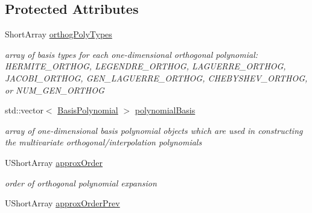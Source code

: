 \subsection*{Protected Attributes}
\begin{DoxyCompactItemize}
\item 
Short\+Array \hyperlink{classPecos_1_1SharedOrthogPolyApproxData_aa9641c919d4da3793dbdbbc4480564a0}{orthog\+Poly\+Types}\label{classPecos_1_1SharedOrthogPolyApproxData_aa9641c919d4da3793dbdbbc4480564a0}

\begin{DoxyCompactList}\small\item\em array of basis types for each one-\/dimensional orthogonal polynomial\+: H\+E\+R\+M\+I\+T\+E\+\_\+\+O\+R\+T\+H\+OG, L\+E\+G\+E\+N\+D\+R\+E\+\_\+\+O\+R\+T\+H\+OG, L\+A\+G\+U\+E\+R\+R\+E\+\_\+\+O\+R\+T\+H\+OG, J\+A\+C\+O\+B\+I\+\_\+\+O\+R\+T\+H\+OG, G\+E\+N\+\_\+\+L\+A\+G\+U\+E\+R\+R\+E\+\_\+\+O\+R\+T\+H\+OG, C\+H\+E\+B\+Y\+S\+H\+E\+V\+\_\+\+O\+R\+T\+H\+OG, or N\+U\+M\+\_\+\+G\+E\+N\+\_\+\+O\+R\+T\+H\+OG \end{DoxyCompactList}\item 
std\+::vector$<$ \hyperlink{classPecos_1_1BasisPolynomial}{Basis\+Polynomial} $>$ \hyperlink{classPecos_1_1SharedOrthogPolyApproxData_a9b1c6d91c0a7c0dcf1c392e5f2481eec}{polynomial\+Basis}\label{classPecos_1_1SharedOrthogPolyApproxData_a9b1c6d91c0a7c0dcf1c392e5f2481eec}

\begin{DoxyCompactList}\small\item\em array of one-\/dimensional basis polynomial objects which are used in constructing the multivariate orthogonal/interpolation polynomials \end{DoxyCompactList}\item 
U\+Short\+Array \hyperlink{classPecos_1_1SharedOrthogPolyApproxData_a73cfe58f0e35ea62e369fc419d48e670}{approx\+Order}\label{classPecos_1_1SharedOrthogPolyApproxData_a73cfe58f0e35ea62e369fc419d48e670}

\begin{DoxyCompactList}\small\item\em order of orthogonal polynomial expansion \end{DoxyCompactList}\item 
U\+Short\+Array \hyperlink{classPecos_1_1SharedOrthogPolyApproxData_a25d4b3e9181f42c892320992157f275a}{approx\+Order\+Prev}\label{classPecos_1_1SharedOrthogPolyApproxData_a25d4b3e9181f42c892320992157f275a}


\end{DoxyCompactItemize}
